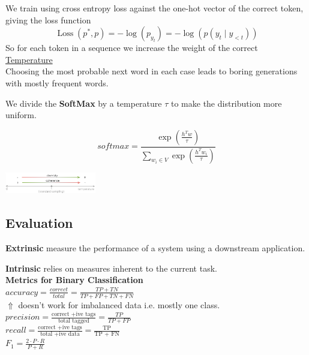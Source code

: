 \documentclass[8pt]{extarticle} %
\begin{document}
\begin{multicols*}{3}
We train using cross entropy loss against the one-hot vector of the correct token, giving the loss function
$$\operatorname{Loss}\left(p^*, p\right)=-\log \left(p_{y_t}\right)=-\log \left(p\left(y_t \mid y_{<t}\right)\right)$$
So for each token in a sequence we increase the weight of the correct\\ 

\underline{Temperature}\\

Choosing the most probable next word in each case leads to boring generations with mostly frequent words. 

We divide the \textbf{SoftMax} by a temperature $\tau$ to make the distribution more uniform.

$$softmax = \frac{\exp \left(\frac{h^T w}{\tau}\right)}{\sum_{w_i \in V} \exp \left(\frac{h^T w_i}{\tau}\right)}$$

\begin{center}
    \includegraphics[width=0.3\textwidth]{media/diversity.png}
\end{center}

\subsection*{Evaluation}
\textbf{Extrinsic} measure the performance of a system using a downstream application.

\textbf{Intrinsic} relies on measures inherent to the current task.\\

\textbf{Metrics for Binary Classification}\\
${accuracy}=\frac{correct}{total}=\frac{TP+TN}{TP+FP+TN+FN}$\\
$\Uparrow$ doesn't work for imbalanced data i.e. mostly one class.\\
${precision}=\frac{\text{correct +ive tags}}{\text{total tagged}}=\frac{T P}{T P+F P}$\\
${recall}= \frac{\text{correct +ive tags}}{\text{total +ive data}}=\frac{\text{TP}}{\text{TP + FN}}$\\
$F_1=\frac{2 \cdot P \cdot R}{P+R}$


\end{multicols*}
\end{document}
